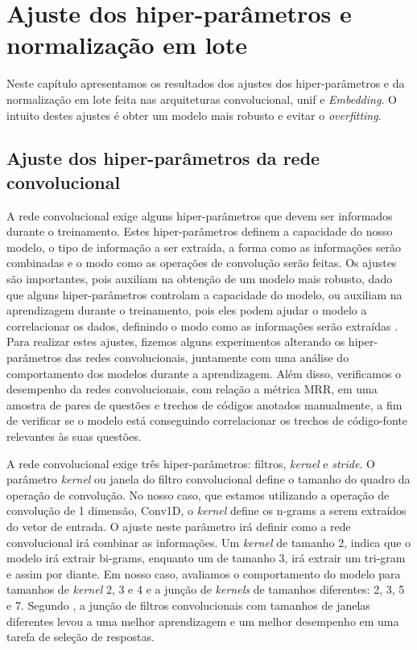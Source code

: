 \chapter{Ajuste dos hiper-parâmetros e normalização em lote}
\label{ape:ajuste-hiper-parametros-cnn}

Neste capítulo apresentamos os resultados dos ajustes dos hiper-parâmetros e da normalização em lote feita nas arquiteturas convolucional, \Gls{unif} e \textit{Embedding}. O intuito destes ajustes é obter um modelo mais robusto e evitar o \textit{overfitting}.

\section{Ajuste dos hiper-parâmetros da rede convolucional}
\label{sec:ajuste-hiper-parametros-cnn}

A rede convolucional exige alguns hiper-parâmetros que devem ser informados durante o treinamento. Estes hiper-parâmetros definem a capacidade do nosso modelo, o tipo de informação a ser extraída, a forma como as informações serão combinadas e o modo como as operações de convolução serão feitas. Os ajustes são importantes, pois auxiliam na obtenção de um modelo mais robusto, dado que alguns hiper-parâmetros controlam a capacidade do modelo, ou auxiliam na aprendizagem durante o treinamento, pois eles podem ajudar o modelo a correlacionar os dados, definindo o modo como as informações serão extraídas \cite{bengio-hyper-parameter-optimization-2012}. Para realizar estes ajustes, fizemos alguns experimentos alterando os hiper-parâmetros das redes convolucionais, juntamente com uma análise do comportamento dos modelos durante a aprendizagem. Além disso, verificamos o desempenho da redes convolucionais, com relação a métrica MRR, em uma amostra de pares de questões e trechos de códigos anotados manualmente, a fim de verificar se o modelo está conseguindo correlacionar os trechos de código-fonte relevantes às suas questões.

A rede convolucional exige três hiper-parâmetros: filtros, \textit{kernel} e \textit{stride}.
O parâmetro \textit{kernel} ou janela do filtro convolucional define o tamanho do quadro da operação de convolução. No nosso caso, que estamos utilizando a operação de convolução de 1 dimensão, Conv1D, o \textit{kernel} define os n-grams a serem extraídos do vetor de entrada. O ajuste neste parâmetro irá definir como a rede convolucional irá combinar as informações. Um \textit{kernel} de tamanho 2, indica que o modelo irá extrair bi-grams, enquanto um de tamanho 3, irá extrair um tri-gram e assim por diante. Em nosso caso, avaliamos o comportamento do modelo para tamanhos de \textit{kernel} 2, 3 e 4 e a junção de \textit{kernels} de tamanhos diferentes: 2, 3, 5 e 7. Segundo , a junção de filtros convolucionais com tamanhos de janelas diferentes levou a uma melhor aprendizagem e um melhor desempenho em uma tarefa de seleção de respostas.



